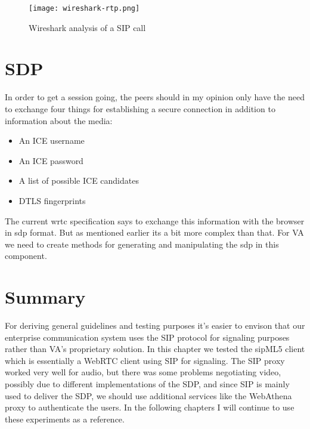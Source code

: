 \begin{figure}[here]
\centerline{\texttt{[image: wireshark-rtp.png]}}
\caption{Wireshark analysis of a SIP call}
\label{fig:wireshark-sip-call}
\end{figure}

\section{SDP}
In order to get a session going, the peers should in my opinion only have the need to exchange four things for establishing a secure connection in addition to information about the media:

\begin{itemize}
\item{An ICE username}
\item{An ICE password}
\item{A list of possible ICE candidates}
\item{DTLS fingerprint}s
\end{itemize}

The current \gls{wrtc} specification says to exchange this information with the browser in \gls{sdp} format. But as mentioned earlier its a bit more complex than that. For VA we need to create methods for generating and manipulating the \gls{sdp} in this component.

\section{Summary}
For deriving general guidelines and testing purposes it's easier to envison that our enterprise communication system uses the SIP protocol for signaling purposes rather than VA's proprietary solution. In this chapter we tested the sipML5 client which is essentially a WebRTC client using SIP for signaling. The SIP proxy worked very well for audio, but there was some problems negotiating video, possibly due to different implementations of the SDP, and since SIP is mainly used to deliver the SDP, we should use additional services like the WebAthena proxy to authenticate the users. In the following chapters I will continue to use these experiments as a reference.